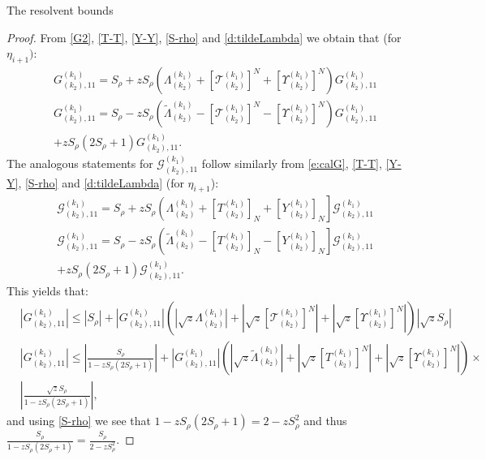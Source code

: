 \documentclass[11pt, a4paper, oneside]{book}
\numberwithin{equation}{chapter}
\begin{document}
\begin{section}{The resolvent bounds}
\begin{proof}
From \eqref{G2}, \eqref{T-T}, \eqref{Y-Y}, \eqref{S-rho} and \eqref{d:tildeLambda} we obtain that (for $\eta_{i+1})$:
%
\begin{align}
&G^{(k_1)}_{(k_2), 11} = S_{\rho} + zS_{\rho} \left (\Lambda^{(k_1)}_{(k_2)} + [\mathcal{T}_{(k_2)}^{(k_1)}]^N + [\Upsilon^{(k_1)}_{(k_2)}]^N \right ) G^{(k_1)}_{(k_2), 11}  \\
&G^{(k_1)}_{(k_2),11} = S_{\rho} - zS_{\rho} \left (\tilde{\Lambda}^{(k_1)}_{(k_2)}- [\mathcal{T}_{(k_2)}^{(k_1)}]^N - [\Upsilon^{(k_1)}_{(k_2)}]^N \right ) G^{(k_1)}_{(k_2), 11} \nonumber \\ 
&+ zS_{\rho}(2S_{\rho} + 1) G^{(k_1)}_{(k_2), 11}.
\end{align}
%
The analogous statements for $\mathcal{G}^{(k_1)}_{(k_2),11}$ follow similarly from \eqref{e:calG}, \eqref{T-T}, \eqref{Y-Y}, \eqref{S-rho} and \eqref{d:tildeLambda} (for $\eta_{i+1}$):
%
\begin{align} \label{e:bootstrapcalG}
&\mathcal{G}^{(k_1)}_{(k_2), 11} = S_{\rho} +z S_{\rho} \left (\Lambda^{(k_1)}_{(k_2)} + [T_{(k_2)}^{(k_1)}]_N + [Y^{(k_1)}_{(k_2)}]_N \right] \mathcal{G}^{(k_1)}_{(k_2), 11} \\
&\mathcal{G}^{(k_1)}_{(k_2), 11} = S_{\rho} - z S_{\rho} \left (\tilde{\Lambda}^{(k_1)}_{(k_2)} - [T_{(k_2)}^{(k_1)}]_N - [Y^{(k_1)}_{(k_2)}]_N \right] \mathcal{G}^{(k_1)}_{(k_2), 11} \nonumber \\
&+ zS_{\rho}(2S_{\rho} + 1) \mathcal{G}^{(k_1)}_{(k_2), 11}.
\end{align}
%
This yields that:
%
\begin{align*}
&|G^{(k_1)}_{(k_2),11}|\leq |S_{\rho}| + \left |G^{(k_1)}_{(k_2),11} \right | \left ( \left |\sqrt{z}
\Lambda^{(k_1)}_{(k_2)} \right |+ \left | \sqrt{z}[\mathcal{T}^{(k_1)}_{(k_2)}]^N \right|+\left |\sqrt{z}[\Upsilon^{(k_1)}_{(k_2)}]^N \right | \right )|\sqrt{z} S_{\rho}|
\\
&|G^{(k_1)}_{(k_2),11}|\leq \left|\frac{S_{\rho}}{1-z S_{\rho}(2S_{\rho} +1)}\right| + \left |G^{(k_1)}_{(k_2),11} \right | \left ( \left |\sqrt{z} \tilde{\Lambda}^{(k_1)}_{(k_2)} \right |+ \left |\sqrt{z} [T^{(k_1)}_{(k_2)}]^N \right |+ \left |\sqrt{z}[\Upsilon^{(k_1)}_{(k_2)}]^N \right | \right ) \times \\
&\left | \frac{ \sqrt{z} S_{\rho}}{1-z S_{\rho}(2S_{\rho} +1)} \right |,
\end{align*}
%
and using \eqref{S-rho} we see that $1-z S_{\rho}(2S_{\rho} +1) = 2 -zS_{\rho}^2$ and thus $\frac{S_{\rho}}{1-z S_{\rho}(2S_{\rho} +1)}= \frac{S_{\rho}}{2-zS_{\rho}^2}$.


\end{proof}
\end{section}
\end{document}
